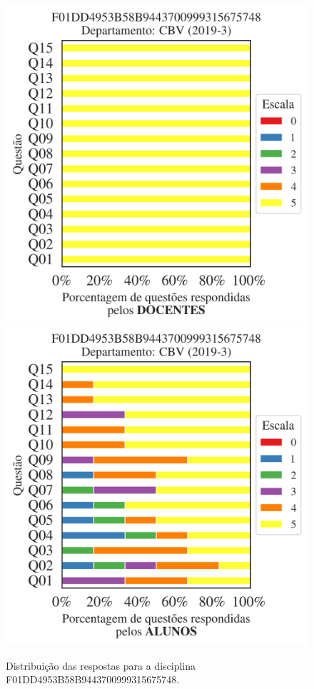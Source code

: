 \documentclass[a4paper,10pt]{article}
\begin{document}
\begin{figure}[h]
\centering
\includegraphics[width=0.485\linewidth]{analise_disciplina_departamento_CBV_F01DD4953B58B9443700999315675748_docentes.png}
\includegraphics[width=0.485\linewidth]{analise_disciplina_departamento_CBV_F01DD4953B58B9443700999315675748_alunos.png}
\caption{\label{fig:analise_geral_departamento}                Distribuição das respostas para a disciplina F01DD4953B58B9443700999315675748. }
\end{figure}
\end{document}
